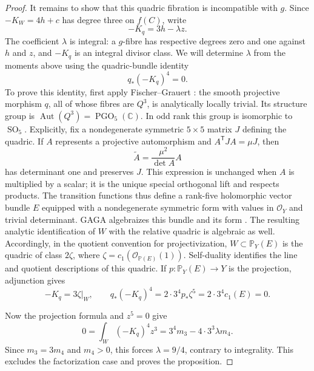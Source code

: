 \begin{proof}
It remains to show that this quadric fibration is incompatible with
$g$. Since $-K_W=4h+c$ has degree three on $f(C)$, write
\[
 -K_q=3h-\lambda z.
\]
The coefficient $\lambda$ is integral: a $g$-fibre has respective
degrees zero and one against $h$ and $z$, and $-K_q$ is an integral
divisor class. We will determine $\lambda$ from the moments above
using the quadric-bundle identity
\[
 q_*(-K_q)^4=0.
\]
To prove this identity, first apply Fischer--Grauert
\cite{FischerGrauert1965}: the smooth projective morphism $q$, all of
whose fibres are $Q^3$, is analytically locally trivial. Its structure
group is $\operatorname{Aut}(Q^3)=\operatorname{PGO}_5(\mathbb C)$.
In odd rank this group is isomorphic to $\operatorname{SO}_5$.
Explicitly, fix a nondegenerate symmetric $5\times5$ matrix $J$ defining
the quadric. If $A$ represents a projective automorphism and
$A^{\mathsf T}JA=\mu J$, then
\[
 \widetilde A=\frac{\mu^2}{\det A}A
\]
has determinant one and preserves $J$. This expression is unchanged
when $A$ is multiplied by a scalar; it is the unique special
orthogonal lift and respects products. The transition functions thus
define a rank-five holomorphic vector bundle $E$ equipped with a
nondegenerate symmetric form with values in $\mathcal O_Y$ and
trivial determinant. GAGA algebraizes this bundle and its form
\cite[Theorems~2--3 and Propositions~15, 18]{Serre1956}.
The resulting analytic identification of $W$ with the relative quadric
is algebraic as well.
Accordingly, in the quotient convention for projectivization,
$W\subset\mathbb P_Y(E)$ is the quadric of class $2\zeta$, where
$\zeta=c_1(\mathcal O_{\mathbb P(E)}(1))$. Self-duality identifies
the line and quotient descriptions of this quadric. If
$p:\mathbb P_Y(E)\to Y$ is the projection, adjunction gives
\[
 -K_q=3\zeta|_W,
 \qquad q_*(-K_q)^4=2\cdot3^4p_*\zeta^5
 =2\cdot3^4c_1(E)=0.
\]

Now the projection formula and $z^5=0$ give
\[
 0=\int_W(-K_q)^4z^3=3^4m_3-4\cdot3^3\lambda m_4.
\]
Since $m_3=3m_4$ and $m_4>0$, this forces $\lambda=9/4$,
contrary to integrality. This excludes the factorization case and
proves the proposition.
\end{proof}
